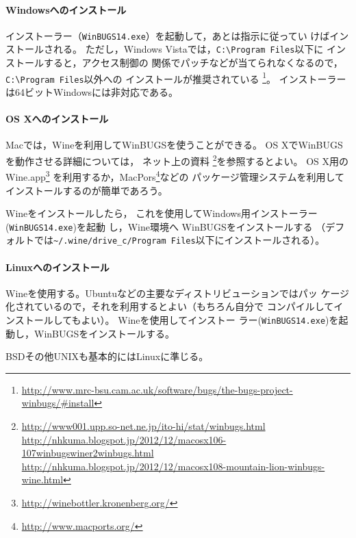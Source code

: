 \documentclass[11pt,uplatex]{jsarticle}
\begin{document}
\paragraph{Windowsへのインストール}

インストーラー（\texttt{WinBUGS14.exe}）を起動して，あとは指示に従ってい
けばインストールされる。
ただし，Windows Vistaでは，\texttt{C:{\textbackslash}Program~Files}以下に
インストールすると，アクセス制御の
関係でパッチなどが当てられなくなるので，\texttt{C:{\textbackslash}Program~Files}以外への
インストールが推奨されている
\footnote{\url{http://www.mrc-bsu.cam.ac.uk/software/bugs/the-bugs-project-winbugs/#install}}。
インストーラーは64ビットWindowsには非対応である。

\paragraph{OS Xへのインストール}

Macでは，\textsf{Wine}を利用して\textsf{WinBUGS}を使うことができる。
OS Xで\textsf{WinBUGS}を動作させる詳細については，
ネット上の資料
\footnote{\url{http://www001.upp.so-net.ne.jp/ito-hi/stat/winbugs.html}\\
\url{http://nhkuma.blogspot.jp/2012/12/macosx106-107winbugswiner2winbugs.html}\\
\url{http://nhkuma.blogspot.jp/2012/12/macosx108-mountain-lion-winbugs-wine.html}}を参照するとよい。
OS X用の\textsf{Wine.app}\footnote{\url{http://winebottler.kronenberg.org/}}
を利用するか，\textsf{MacPors}\footnote{\url{http://www.macports.org/}}などの
パッケージ管理システムを利用してインストールするのが簡単であろう。

\textsf{Wine}をインストールしたら，
これを使用してWindows用インストーラー
(\texttt{WinBUGS14.exe})を起動
し，\textsf{Wine}環境へ
\textsf{WinBUGS}をインストールする
（デフォルトでは\texttt{\textasciitilde/.wine/drive\_c/Program Files}以下にインストールされる）。


\paragraph{Linuxへのインストール}
\textsf{Wine}を使用する。Ubuntuなどの主要なディストリビューションではパッ
ケージ化されているので，それを利用するとよい（もちろん自分で
コンパイルしてインストールしてもよい）。
\textsf{Wine}を使用してインストー
ラー(\texttt{WinBUGS14.exe})を起動し，\textsf{WinBUGS}をインストールする。

BSDその他UNIXも基本的にはLinuxに準じる。
\end{document}
